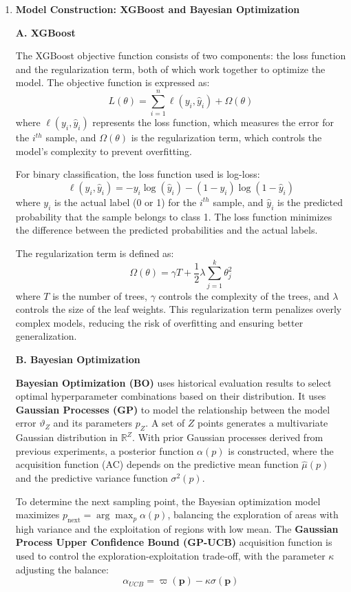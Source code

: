 \documentclass[12pt]{article}  %
\begin{document}
\begin{enumerate}[\textbullet]
    \item \textbf{Model Construction: XGBoost and Bayesian Optimization}

\textbf{A. XGBoost}

The XGBoost objective function consists of two components: the loss function and the regularization term, both of which work together to optimize the model. The objective function is expressed as:
\[
L(\theta) = \sum_{i=1}^{n} \ell(y_i, \hat{y}_i) + \Omega(\theta) \tag{8}
\]
where \(\ell(y_i, \hat{y}_i)\) represents the loss function, which measures the error for the \(i^{th}\) sample, and \(\Omega(\theta)\) is the regularization term, which controls the model's complexity to prevent overfitting.

For binary classification, the loss function used is log-loss:
\[
\ell(y_i, \hat{y}_i) = - y_i \log(\hat{y}_i) - (1 - y_i) \log(1 - \hat{y}_i) \tag{9}
\]
where \(y_i\) is the actual label (0 or 1) for the \(i^{th}\) sample, and \(\hat{y}_i\) is the predicted probability that the sample belongs to class 1. The loss function minimizes the difference between the predicted probabilities and the actual labels.

The regularization term is defined as:
\[
\Omega(\theta) = \gamma T + \frac{1}{2} \lambda \sum_{j=1}^{k} \theta_j^2 \tag{10}
\]
where \(T\) is the number of trees, \(\gamma\) controls the complexity of the trees, and \(\lambda\) controls the size of the leaf weights. This regularization term penalizes overly complex models, reducing the risk of overfitting and ensuring better generalization.

\textbf{B. Bayesian Optimization}

\textbf{Bayesian Optimization (BO)} uses historical evaluation results to select optimal hyperparameter combinations based on their distribution\cite{8}. It uses \textbf{Gaussian Processes (GP)} to model the relationship between the model error $\vartheta_Z$ and its parameters $p_Z$. A set of $Z$ points generates a multivariate Gaussian distribution in $\mathbb{R}^Z$. With prior Gaussian processes derived from previous experiments, a posterior function $\alpha(p)$ is constructed, where the acquisition function (AC) depends on the predictive mean function $\hat{\mu}(p)$ and the predictive variance function $\sigma^2(p)$.

To determine the next sampling point, the Bayesian optimization model maximizes $p_{\text{next}} = \arg \max_p \alpha(p)$, balancing the exploration of areas with high variance and the exploitation of regions with low mean. The \textbf{Gaussian Process Upper Confidence Bound (GP-UCB)} acquisition function is used to control the exploration-exploitation trade-off, with the parameter $\kappa$ adjusting the balance:
\begin{equation}
    \alpha_{UCB} = \varpi(\mathbf{p}) - \kappa \sigma(\mathbf{p}) \tag{11}
\end{equation}


\end{enumerate}
\end{document}
